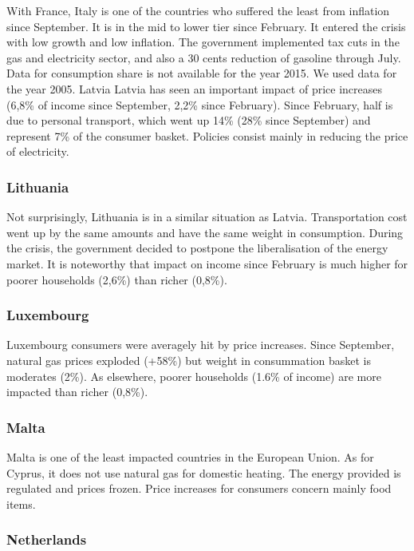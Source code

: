 \documentclass[
  9pt,
  a4paper,
  DIV=11,
  numbers=noendperiod,
  oneside]{scrartcl}
\begin{document}
With France, Italy is one of the countries who suffered the least from
inflation since September. It is in the mid to lower tier since
February. It entered the crisis with low growth and low inflation. The
government implemented tax cuts in the gas and electricity sector, and
also a 30 cents reduction of gasoline through July. Data for consumption
share is not available for the year 2015. We used data for the year
2005. Latvia Latvia has seen an important impact of price increases
(6,8\% of income since September, 2,2\% since February). Since February,
half is due to personal transport, which went up 14\% (28\% since
September) and represent 7\% of the consumer basket. Policies consist
mainly in reducing the price of electricity.

\hypertarget{lithuania}{%
\subsubsection{Lithuania}\label{lithuania}}

Not surprisingly, Lithuania is in a similar situation as Latvia.
Transportation cost went up by the same amounts and have the same weight
in consumption. During the crisis, the government decided to postpone
the liberalisation of the energy market. It is noteworthy that impact on
income since February is much higher for poorer households (2,6\%) than
richer (0,8\%).

\hypertarget{luxembourg}{%
\subsubsection{Luxembourg}\label{luxembourg}}

Luxembourg consumers were averagely hit by price increases. Since
September, natural gas prices exploded (+58\%) but weight in
consummation basket is moderates (2\%). As elsewhere, poorer households
(1.6\% of income) are more impacted than richer (0,8\%).

\hypertarget{malta}{%
\subsubsection{Malta}\label{malta}}

Malta is one of the least impacted countries in the European Union. As
for Cyprus, it does not use natural gas for domestic heating. The energy
provided is regulated and prices frozen. Price increases for consumers
concern mainly food items.

\hypertarget{netherlands}{%
\subsubsection{Netherlands}\label{netherlands}}
\end{document}
